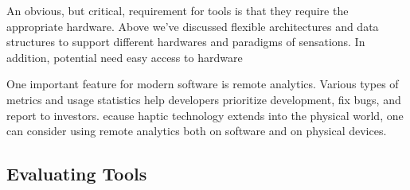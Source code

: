 An obvious, but critical, requirement for \haxd tools is that they require the appropriate hardware.
Above we've discussed flexible architectures and data structures to support different hardwares and paradigms of sensations.
In addition, potential  need easy access to hardware


One important feature for modern software is remote analytics.
Various types of metrics and usage statistics help developers prioritize development, fix bugs, and report to investors.
ecause haptic technology extends into the physical world, one can consider using remote analytics both on software and on physical devices.



%
%
\subsection{Evaluating \haxd Tools}




